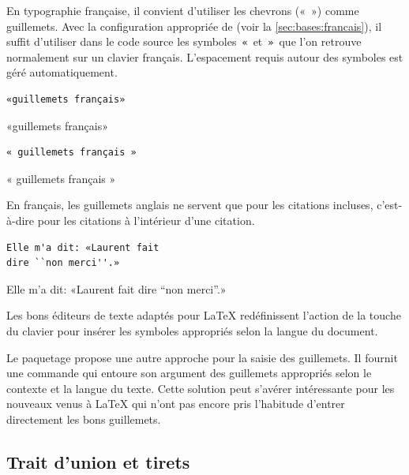 {En typographie française, il convient d'utiliser les chevrons («\ »)
comme guillemets. Avec la configuration appropriée de 
(voir la \autoref{sec:bases:francais}), il suffit d'utiliser dans le
code source les symboles \,\verb=«=\, et \,\verb=»=\, que l'on
retrouve normalement sur un clavier français. L'espacement requis
autour des symboles est géré automatiquement.
\begin{demo}
  \begin{texample}
\begin{lstlisting}
«guillemets français»
\end{lstlisting}
    \producing
    «guillemets français»
  \end{texample}
  \begin{texample}
\begin{lstlisting}
« guillemets français »
\end{lstlisting}
    \producing
    « guillemets français »
  \end{texample}
\end{demo}
En français, les guillemets anglais ne servent que pour les citations
incluses, c'est-à-dire pour les citations à l'intérieur d'une
citation.
\begin{demo}
  \begin{texample}
\begin{lstlisting}[escapeinside={}]
Elle m'a dit: «Laurent fait
dire ``non merci''.»
\end{lstlisting}
    \producing
    Elle m'a dit: «Laurent fait
    dire ``non merci''.»
  \end{texample}
\end{demo}

Les bons éditeurs de texte adaptés pour {\LaTeX} redéfinissent
l'action de la touche %
\raisebox{-2pt}{%
  \ooalign{\hfil\Large\faSquareO\hfil\cr\hfil\ttfamily\textquotedbl\hfil}} %
du clavier pour insérer les symboles appropriés selon la langue du
document.

Le paquetage  \citep{csquotes} propose une autre approche
pour la saisie des guillemets. Il fournit une commande
\cmdprint{\enquote} qui entoure son argument des guillemets appropriés
selon le contexte et la langue du texte. Cette solution peut s'avérer
intéressante pour les nouveaux venus à {\LaTeX} qui n'ont pas encore
pris l'habitude d'entrer directement les bons guillemets.

\subsection{Trait d'union et tirets}
\label{sec:bases:caracteres:tirets}

}
